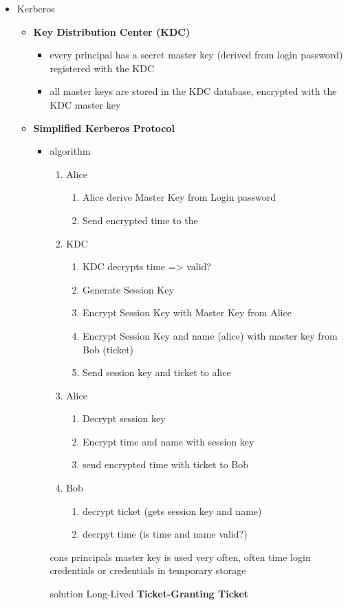 \documentclass[11pt,twoside,landscape]{article}
\begin{document}
\begin{multicols}{4}
\begin{itemize}
\item Kerberos
\label{sec:orga21556e}
\begin{itemize}
\item \textbf{Key Distribution Center (KDC)}
\begin{itemize}
\item every principal has a secret master key (derived from login password) registered with the KDC
\item all master keys are stored in the KDC database, encrypted with the KDC master key
\end{itemize}

\item \textbf{Simplified Kerberos Protocol}
\begin{itemize}
\item algorithm 
\begin{enumerate}
\item Alice
\begin{enumerate}
\item Alice derive Master Key from Login password
\item Send encrypted time to the
\end{enumerate}
\item KDC
\begin{enumerate}
\item KDC decrypts time => valid?
\item Generate Session Key
\item Encrypt Session Key with Master Key from Alice
\item Encrypt Session Key and name (alice) with master key from Bob (ticket)
\item Send session key and ticket to alice
\end{enumerate}
\item Alice
\begin{enumerate}
\item Decrypt session key
\item Encrypt time and name with session key
\item send encrypted time with ticket to Bob
\end{enumerate}
\item Bob
\begin{enumerate}
\item decrypt ticket (gets session key and name)
\item decrpyt time (is time and name valid?)
\end{enumerate}
\end{enumerate}
\item[{cons}] principals master key is used very often, often time login credentials or credentials in temporary storage
\item[{solution}] Long-Lived \textbf{Ticket-Granting Ticket}
\end{itemize}


\end{itemize}
\end{itemize}
\end{multicols}
\end{document}
